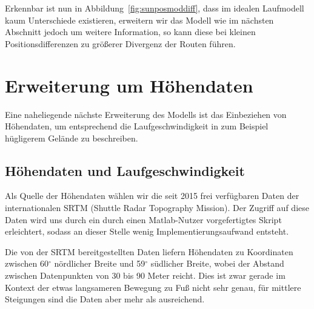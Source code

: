 \documentclass[
    paper=a4,
    DIV14,
    fontsize=12pt,
    pagesize=pdftex,
    toc=bibliographynumbered
]{scrartcl}
\numberwithin{figure}{section}
\numberwithin{equation}{section}
\numberwithin{table}{section}
\begin{document}
Erkennbar ist nun in Abbildung~\ref{fig:sunposmoddiff}, dass im idealen Laufmodell kaum
Unterschiede existieren, erweitern wir das Modell wie im nächsten Abschnitt jedoch um
weitere Information, so kann diese bei kleinen Positionsdifferenzen zu größerer Divergenz
der Routen führen.

\section{Erweiterung um Höhendaten}
Eine naheliegende nächste Erweiterung des Modells ist das Einbeziehen von Höhendaten, um
entsprechend die Laufgeschwindigkeit in zum Beispiel hügligerem Gelände zu beschreiben.

\subsection{Höhendaten und Laufgeschwindigkeit}
Als Quelle der Höhendaten wählen wir die seit 2015 frei verfügbaren Daten der
internationalen SRTM (Shuttle Radar Topography Mission). Der Zugriff auf diese Daten wird
uns durch ein durch einen Matlab-Nutzer vorgefertigtes Skript erleichtert, sodass an
dieser Stelle wenig Implementierungsaufwand entsteht.

Die von der SRTM bereitgestellten Daten liefern Höhendaten zu Koordinaten zwischen
60$^\circ$ nördlicher Breite und 59$^\circ$ südlicher Breite, wobei der Abstand zwischen
Datenpunkten von 30 bis 90 Meter reicht. Dies ist zwar gerade im Kontext der etwas
langsameren Bewegung zu Fuß nicht sehr genau, für mittlere Steigungen sind die Daten aber
mehr als ausreichend.
\end{document}

